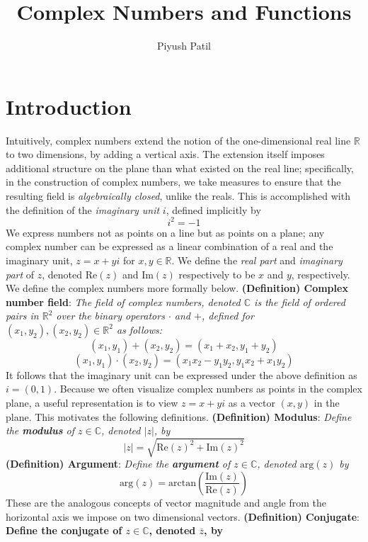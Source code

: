 \documentclass{article}
\newcommand*{\tb}{\textbf}
\newcommand*{\ti}{\textit}
\newcommand*{\nn}{\newline \newline}
\newcommand*{\R}{\mathbb{R}}
\newcommand*{\C}{\mathbb{C}}
\begin{document}
\title{Complex Numbers and Functions}
\author{Piyush Patil}
\maketitle

\section{Introduction}

Intuitively, complex numbers extend the notion of the one-dimensional real line $ \R $ to two dimensions, by adding a vertical axis. The extension itself imposes additional structure on the plane than what existed on the real line; specifically, in the construction of complex numbers, we take measures to ensure that the resulting field is \textit{algebraically closed}, unlike the reals. This is accomplished with the definition of the \textit{imaginary unit} $ i $, defined implicitly by
$$ i^2 = -1 $$
We express numbers not as points on a line but as points on a plane; any complex number can be expressed as a linear combination of a real and the imaginary unit, $ z = x + y i $ for $ x, y \in \R $. We define the \textit{real part} and \textit{imaginary part} of $ z $, denoted $ \text{Re}(z) $ and $ \text{Im}(z) $ respectively to be $ x $ and $ y $, respectively. We define the complex numbers more formally below.
\nn
\tb{(Definition) Complex number field}: \ti{The field of complex numbers, denoted $ \C $ is the field of ordered pairs in $ \R^2 $ over the binary operators $ \cdot $ and $ + $, defined for $ (x_1, y_2), (x_2, y_2) \in \R^2 $ as follows:}
$$ (x_1, y_1) + (x_2, y_2) = (x_1 + x_2, y_1 + y_2) $$
$$ (x_1, y_1) \cdot (x_2, y_2) = (x_1 x_2 - y_1 y_2, y_1 x_2 + x_1 y_2) $$
It follows that the imaginary unit can be expressed under the above definition as $ i = (0, 1) $. Because we often visualize complex numbers as points in the complex plane, a useful representation is to view $ z = x + y i $ as a vector $ (x, y) $ in the plane. This motivates the following definitions.
\nn
\tb{(Definition) Modulus}: \ti{Define the \tb{modulus} of $ z \in \C $, denoted $ | z | $, by}
$$ | z | = \sqrt{\text{Re}(z)^2 + \text{Im}(z)^2} $$
\nn
\tb{(Definition) Argument}: \ti{Define the \tb{argument} of $ z \in \C $, denoted $ \text{arg}(z) $ by}
$$ \text{arg}(z) = \text{arctan} \left( \frac{\text{Im}(z)}{\text{Re}(z)} \right) $$
These are the analogous concepts of vector magnitude and angle from the horizontal axis we impose on two dimensional vectors.
\nn
\tb{(Definition) Conjugate}: \tb{Define the \tb{conjugate} of $ z \in \C $, denoted $ \overline{z} $, by}
\end{document}
